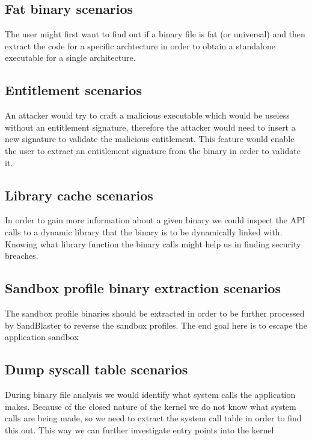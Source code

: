 
\subsection{Fat binary scenarios}

The user might first want to find out if a binary file is fat (or universal)
and then extract the code for a specific archtecture in order to obtain a
standalone executable for a single architecture.

\subsection{Entitlement scenarios}

An attacker would try to craft a malicious executable which would be useless
without an entitlement signature, therefore the attacker would need to insert
a new signature to validate the malicious entitlement. This feature would
enable the user to extract an entitlement signature from the binary in order
to validate it.

\subsection{Library cache scenarios}

In order to gain more information about a given binary we could inspect the
API calls to a dynamic library that the binary is to be dynamically linked
with. Knowing what library function the binary calls might help us in finding
security breaches.

\subsection{Sandbox profile binary extraction scenarios}

The sandbox profile binaries should be extracted in order to be further
processed by SandBlaster to reverse the sandbox profiles. The end goal here is
to escape the application sandbox

\subsection{Dump syscall table scenarios}

During binary file analysis we would identify what system calls the
application makes. Because of the closed nature of the kernel we do not know
what system calls are being made, so we need to extract the system call table
in order to find this out. This way we can further investigate entry points
into the kernel
